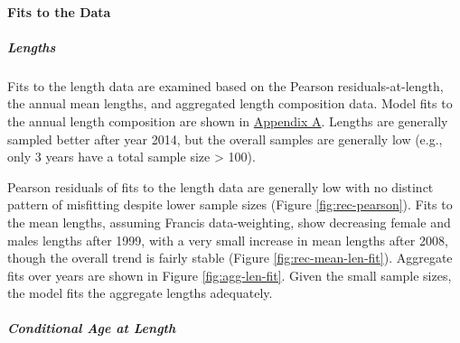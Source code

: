 \documentclass[11pt,
  english,
  a4paper,
]{article}
\begin{document}
\leavevmode\tagmcend\tagstructend\par


\hypertarget{fits-to-the-data}{%
\paragraph{Fits to the Data}\label{fits-to-the-data}}

\leavevmode\tagmcend\tagstructend


\hypertarget{lengths-1}{%
\subparagraph{Lengths}\label{lengths-1}}

\leavevmode\tagmcend\tagstructend


Fits to the length data are examined based on the Pearson residuals-at-length, the annual mean lengths, and aggregated length composition data. Model fits to the annual length composition are shown in {\protect\hyperlink{app_a}{Appendix A}\leavevmode\tagmcend\tagstructend}. Lengths are generally sampled better after year 2014, but the overall samples are generally low (e.g., only 3 years have a total sample size \textgreater{} 100).

\leavevmode\tagmcend\tagstructend\par


Pearson residuals of fits to the length data are generally low with no distinct pattern of misfitting despite lower sample sizes (Figure \ref{fig:rec-pearson}). Fits to the mean lengths, assuming Francis data-weighting, show decreasing female and males lengths after 1999, with a very small increase in mean lengths after 2008, though the overall trend is fairly stable (Figure \ref{fig:rec-mean-len-fit}). Aggregate fits over years are shown in Figure \ref{fig:agg-len-fit}. Given the small sample sizes, the model fits the aggregate lengths adequately.

\leavevmode\tagmcend\tagstructend\par


\hypertarget{conditional-age-at-length}{%
\subparagraph{Conditional Age at Length}\label{conditional-age-at-length}}

\leavevmode\tagmcend\tagstructend
\end{document}
